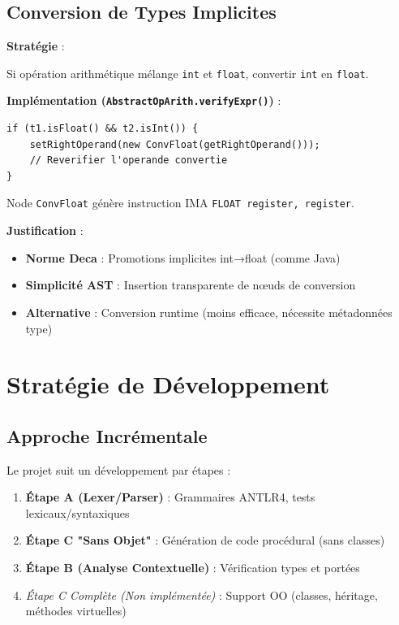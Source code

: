 \documentclass[12pt,a4paper]{article}
\begin{document}
\subsection{Conversion de Types Implicites}

\textbf{Stratégie} :

Si opération arithmétique mélange \texttt{int} et \texttt{float}, convertir \texttt{int} en \texttt{float}.

\textbf{Implémentation (\texttt{AbstractOpArith.verifyExpr()})} :

\begin{lstlisting}[style=javastyle]
if (t1.isFloat() && t2.isInt()) {
    setRightOperand(new ConvFloat(getRightOperand()));
    // Reverifier l'operande convertie
}
\end{lstlisting}

Node \texttt{ConvFloat} génère instruction IMA \texttt{FLOAT register, register}.

\textbf{Justification} :

\begin{itemize}[itemsep=0.2em]
    \item \textbf{Norme Deca} : Promotions implicites int→float (comme Java)
    \item \textbf{Simplicité AST} : Insertion transparente de nœuds de conversion
    \item \textbf{Alternative} : Conversion runtime (moins efficace, nécessite métadonnées type)
\end{itemize}

\section{Stratégie de Développement}

\subsection{Approche Incrémentale}

Le projet suit un développement par étapes :

\begin{enumerate}[itemsep=0.3em]
    \item \textbf{Étape A (Lexer/Parser)} : Grammaires ANTLR4, tests lexicaux/syntaxiques
    \item \textbf{Étape C "Sans Objet"} : Génération de code procédural (sans classes)
    \item \textbf{Étape B (Analyse Contextuelle)} : Vérification types et portées
    \item \textit{Étape C Complète (Non implémentée)} : Support OO (classes, héritage, méthodes virtuelles)
\end{enumerate}
\end{document}
